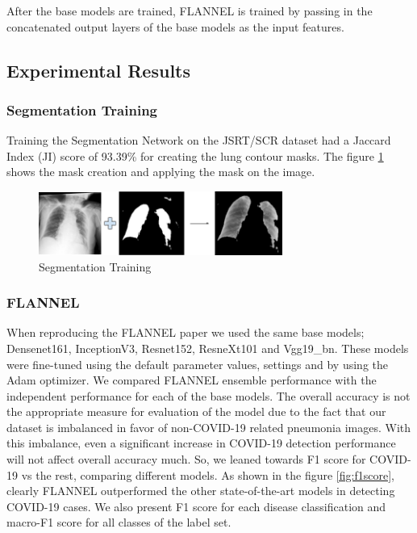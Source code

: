 \documentclass{sigkddExp}
\begin{document}
After the base models are trained, FLANNEL is trained by passing in the
concatenated output layers of the base models as the input features.

\subsection{Experimental Results}
\subsubsection{Segmentation Training}
Training the Segmentation Network on the JSRT/SCR dataset had a Jaccard Index
(JI) score of 93.39\% for creating the lung contour masks. The figure \ref{fig:segtrain}
shows the mask creation and applying the mask on the image.

\begin{figure}[h]
    \includegraphics[width=8cm]{../doc/images/segmentation_training.png}
    \caption{Segmentation Training}
    \label{fig:segtrain}
\end{figure}

\subsubsection{FLANNEL}

When reproducing the FLANNEL paper we used the same base models;  Densenet161,
InceptionV3, Resnet152, ResneXt101 and Vgg19\_bn. These models were fine-tuned
using the default parameter values, settings and by using the Adam optimizer. We
compared FLANNEL ensemble performance with the independent performance for each
of the base models. The overall accuracy is not the appropriate measure for
evaluation of the model due to the fact that our dataset is imbalanced in favor
of non-COVID-19 related pneumonia images. With this imbalance, even a
significant increase in COVID-19 detection performance will not affect overall
accuracy much. So, we leaned towards F1 score for COVID-19 vs the rest,
comparing different models. As shown in the figure \ref{fig:f1score}, clearly
FLANNEL outperformed the other state-of-the-art models in detecting COVID-19
cases. We also present F1 score for each disease classification and macro-F1
score for all classes of the label set. 
\end{document}
